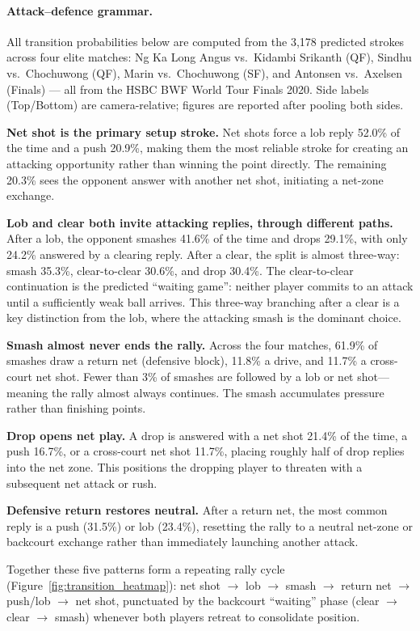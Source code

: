 \paragraph{Attack--defence grammar.}
All transition probabilities below are computed from the 3{,}178 predicted
strokes across four elite matches: Ng Ka Long Angus vs.\ Kidambi Srikanth
(QF), Sindhu vs.\ Chochuwong (QF), Marin vs.\ Chochuwong (SF), and
Antonsen vs.\ Axelsen (Finals) --- all from the HSBC BWF World Tour Finals
2020. Side labels (Top/Bottom) are camera-relative; figures are reported
after pooling both sides.

\textbf{Net shot is the primary setup stroke.}
Net shots force a lob reply 52.0\% of the time and a push 20.9\%,
making them the most reliable stroke for creating an attacking opportunity
rather than winning the point directly. The remaining 20.3\% sees the
opponent answer with another net shot, initiating a net-zone exchange.

\textbf{Lob and clear both invite attacking replies, through different paths.}
After a lob, the opponent smashes 41.6\% of the time and drops 29.1\%,
with only 24.2\% answered by a clearing reply. After a clear, the split is
almost three-way: smash 35.3\%, clear-to-clear 30.6\%, and drop 30.4\%.
The clear-to-clear continuation is the predicted ``waiting game'': neither
player commits to an attack until a sufficiently weak ball arrives.
This three-way branching after a clear is a key distinction from the lob,
where the attacking smash is the dominant choice.

\textbf{Smash almost never ends the rally.}
Across the four matches, 61.9\% of smashes draw a return net (defensive
block), 11.8\% a drive, and 11.7\% a cross-court net shot. Fewer than 3\%
of smashes are followed by a lob or net shot---meaning the rally almost
always continues. The smash accumulates pressure rather than finishing
points.

\textbf{Drop opens net play.}
A drop is answered with a net shot 21.4\% of the time, a push 16.7\%, or
a cross-court net shot 11.7\%, placing roughly half of drop replies into
the net zone. This positions the dropping player to threaten with a
subsequent net attack or rush.

\textbf{Defensive return restores neutral.}
After a return net, the most common reply is a push (31.5\%) or lob (23.4\%),
resetting the rally to a neutral net-zone or backcourt exchange rather than
immediately launching another attack.

Together these five patterns form a repeating rally cycle
(Figure~\ref{fig:transition_heatmap}):
net shot $\rightarrow$ lob $\rightarrow$ smash $\rightarrow$ return net
$\rightarrow$ push/lob $\rightarrow$ net shot, punctuated by the
backcourt ``waiting'' phase (clear $\rightarrow$ clear $\rightarrow$ smash)
whenever both players retreat to consolidate position.

